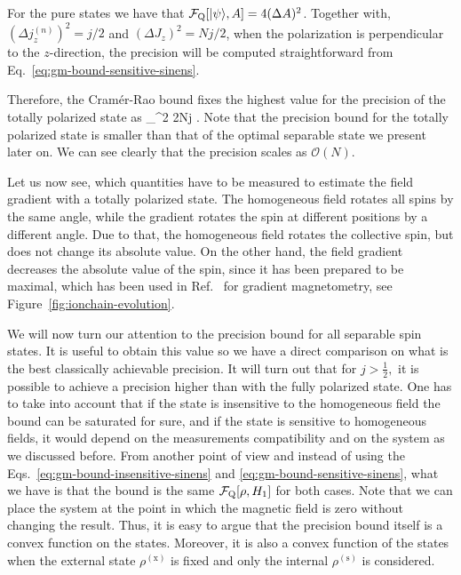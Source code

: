 For the pure states we have that $\mathcal{F}_{\textnormal{Q}}[{\textstyle \vert{\psi}\rangle, A}] = 4(\Delta A)^2$.
Together with,
$(\Delta j_z^{(n)})^2=j/2$ and $(\Delta J_z)^2=Nj/2$, when the polarization is
perpendicular to the $z$-direction, the precision will be computed straightforward from Eq.~\eqref{eq:gm-bound-sensitive-sinens}.

Therefore, the Cram\'er-Rao bound fixes the highest value for the precision
of the totally polarized state as
\be
  _{}\leqslant \sigma^2 2Nj  .
\ee
Note that the precision bound for the totally polarized state
is smaller than that of the optimal separable state we present later on.
We can see clearly that the precision scales as $\mathcal{O}(N)$.

Let us now see, which quantities have to be measured to estimate the field gradient with a totally polarized state.
The homogeneous field rotates all spins by the same angle, while the gradient rotates the spin at different positions by a different angle.
Due to that, the homogeneous field rotates the collective spin, but does not change its absolute value.
On the other hand, the field gradient decreases the absolute value of the spin, since it has been prepared to be maximal, which has been used in Ref.~\cite{Behbood2013} for gradient magnetometry, see Figure~\ref{fig:ionchain-evolution}.


We will now turn our attention to the precision bound for all separable spin states.
It is useful to obtain this value so we have a direct comparison on what is the best classically achievable precision.
It will turn out that for $j>\frac{1}{2},$ it is possible
to achieve a precision higher than with the fully polarized state.
One has to take into account that if the state is insensitive to the homogeneous field the bound can be saturated for sure, and if the state is sensitive to homogeneous fields, it would depend on the measurements compatibility and on the system as we discussed before.
From another point of view and instead of using the Eqs.~\eqref{eq:gm-bound-insensitive-sinens} and \eqref{eq:gm-bound-sensitive-sinens}, what we have is that the bound is the same $\mathcal{F}_{\textnormal{Q}}[{\textstyle \rho, H_1}]$ for both cases.
Note that we can place the system at the point in which the magnetic field is zero without changing the result.
Thus, it is easy to argue that the precision bound itself is a convex function on the states.
Moreover, it is also a convex function of the states when the external state $\rho^{(\text{x})}$ is fixed and only the internal $\rho^{(\text{s})}$ is considered.

